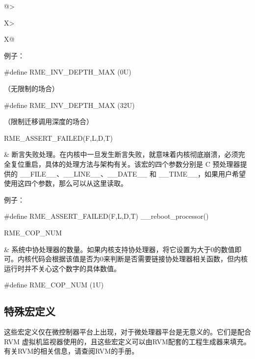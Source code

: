 \begin{xltabular}{\textwidth}{@{}>{\hsize\raggedright\arraybackslash}X>{\hsize\raggedright\arraybackslash}X@{}}
例子：

\#define RME\_INV\_DEPTH\_MAX (0U)

（无限制的场合）

\#define RME\_INV\_DEPTH\_MAX (32U)

（限制迁移调用深度的场合）\strut
\tabularnewline
RME\_ASSERT\_FAILED(F,L,D,T)\strut
 & 断言失败处理。在内核中一旦发生断言失败，就意味着内核彻底崩溃，必须完全复位重启，具体的处理方法与架构有关。该宏的四个参数分别是 C 预处理器提供的 \_\_FILE\_\_、\_\_LINE\_\_、\_\_DATE\_\_ 和 \_\_TIME\_\_，如果用户希望使用这四个参数，那么可以从这里读取。

例子：

\#define RME\_ASSERT\_FAILED(F,L,D,T) \_\_reboot\_processor()\strut
\tabularnewline
RME\_COP\_NUM\strut
 & 系统中协处理器的数量。如果内核支持协处理器，将它设置为大于0的数值即可。内核代码会根据该值是否为0来判断是否需要链接协处理器相关函数，但内核运行时并不关心这个数字的具体数值。

\#define RME\_COP\_NUM (1U)\strut
\tabularnewline
\end{xltabular}

\subsection{特殊宏定义}\label{subsec:7-special-macro-definitions}

这些宏定义仅在微控制器平台上出现，对于微处理器平台是无意义的。它们是配合 RVM 虚拟机监视器使用的，且这些宏定义可以由RVM配套的工程生成器来填充。有关RVM的相关信息，请查阅RVM的手册。

